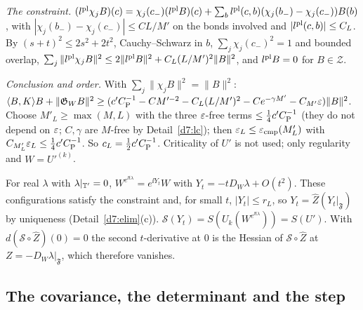 \begin{detail}
\begin{step}
\emph{The constraint.} $(l^{\rm pl}\chi_jB)(c)=\chi_j(c_-)(l^{\rm pl}B)(c)+\sum_bl^{\rm pl}(c,b)(\chi_j(b_-)-\chi_j(c_-))B(b)$, with $|\chi_j(b_-)-\chi_j(c_-)|\le CL/M'$ on the bonds involved and $|l^{\rm pl}(c,b)|\le C_L$. By $(s+t)^2\le2s^2+2t^2$, Cauchy--Schwarz in $b$, $\sum_j\chi_j(c_-)^2=1$ and bounded overlap, $\sum_j\|l^{\rm pl}\chi_jB\|^2\le2\|l^{\rm pl}B\|^2+C_L(L/M')^2\|B\|^2$, and $l^{\rm pl}B=0$ for $B\in\mathcal Z$.
\end{step}
\begin{step}
\emph{Conclusion and order.} With $\sum_j\|\chi_jB\|^2=\|B\|^2$: $\langle B,K\rangle B+\|\mathfrak G_WB\|^2\ge(c'C_{\rm P}^{-1}-CM'^{-2}-C_L(L/M')^2-Ce^{-\gamma M'}-C_{M'}\varepsilon)\|B\|^2$. Choose $M'_L\ge\max(M,L)$ with the three $\varepsilon$-free terms $\le\frac14c'C_{\rm P}^{-1}$ (they do not depend on $\varepsilon$; $C,\gamma$ are $M$-free by Detail~\ref{d7:lc}); then $\varepsilon_L\le\varepsilon_{\rm cmp}(M'_L)$ with $C_{M'_L}\varepsilon_L\le\frac14c'C_{\rm P}^{-1}$. So $c_L=\frac12c'C_{\rm P}^{-1}$. Criticality of $U'$ is not used; only regularity and $W=U'^{(k)}$.
\end{step}
\end{detail}

\begin{detail}\label{d7:gaugedir}
For real $\lambda$ with $\lambda|_{\mathbb T'}=0$, $W^{e^{\ii t\lambda}}=e^{\ii Y_t}W$ with $Y_t=-tD_W\lambda+O(t^2)$. These configurations satisfy the constraint and, for small $t$, $|Y_t|\le r_L$, so $Y_t=\hat Z(Y_t|_{\mathfrak F})$ by uniqueness (Detail~\ref{d7:elim}(c)). $\mathcal S(Y_t)=S(U_k(W^{e^{\ii t\lambda}}))=S(U')$. With $d(\mathcal S\circ\hat Z)(0)=0$ the second $t$-derivative at $0$ is the Hessian of $\mathcal S\circ\hat Z$ at $Z=-D_W\lambda|_{\mathfrak F}$, which therefore vanishes.
\end{detail}

\subsection{The covariance, the determinant and the step}\label{d7:cov-sec}

